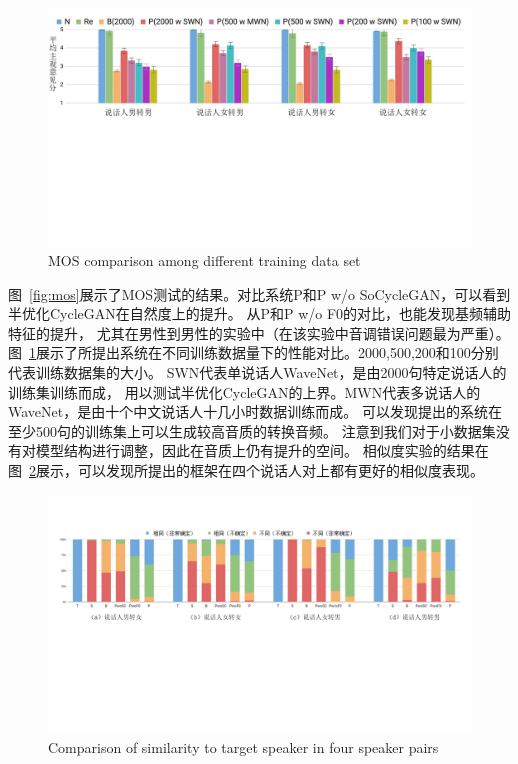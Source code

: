 \begin{figure}[!htp]
    \centering
    \includegraphics[width=13cm,trim=0 290 0 20,clip]{figure/4_mosdata.png}
    {MOS comparison among different training data set}
    \label{fig:mosdata}
\end{figure}


图~\ref{fig:mos}展示了MOS测试的结果。对比系统P和P w/o SoCycleGAN，可以看到半优化CycleGAN在自然度上的提升。
从P和P w/o F0的对比，也能发现基频辅助特征的提升，
尤其在男性到男性的实验中（在该实验中音调错误问题最为严重）。
图~\ref{fig:mosdata}展示了所提出系统在不同训练数据量下的性能对比。2000,500,200和100分别代表训练数据集的大小。
SWN代表单说话人WaveNet，是由2000句特定说话人的训练集训练而成，
用以测试半优化CycleGAN的上界。MWN代表多说话人的WaveNet，是由十个中文说话人十几小时数据训练而成。
可以发现提出的系统在至少500句的训练集上可以生成较高音质的转换音频。
注意到我们对于小数据集没有对模型结构进行调整，因此在音质上仍有提升的空间。
相似度实验的结果在图~\ref{fig:sim}展示，可以发现所提出的框架在四个说话人对上都有更好的相似度表现。


\begin{figure}[!htp]
    \centering
    \includegraphics[width=14cm,trim=25 250 40 60,clip]{figure/4_sim.png}
    {Comparison of similarity to target speaker in four speaker pairs}
    \label{fig:sim}
\end{figure}

